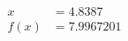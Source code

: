 \documentclass[preview]{standalone}
\begin{document}
\begin{align*}
x &= 4.8387\\f(x) &= 7.9967201
\end{align*}
\end{document}
